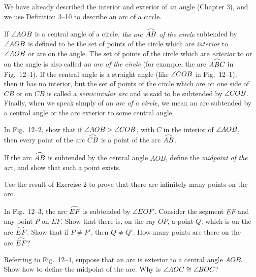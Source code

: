 \documentclass[11pt]{book}
\newcommand{\XIIarc}[1]{\overset{\raisebox{-0.25ex}{\scalebox{1.15}[0.85]{$\frown$}}}{#1}}
\begin{document}
We have already described the interior and exterior of an angle (Chapter 3),
and we use Definition 3--10 to describe an arc of a circle.

\begin{definition}
If $\angle AOB$ is a central angle of a circle, \emph{the arc $\XIIarc{AB}$ of
the circle} subtended by $\angle AOB$ is defined to be the set of points of the
circle which are \emph{interior} to $\angle AOB$ or are on the angle. The set of
points of the circle which are \emph{exterior} to or on the angle is also called
\emph{an arc of the circle} (for example, the arc $\XIIarc{ABC}$ in
Fig.~12--1). If the central angle is a straight angle (like $\angle COB$ in
Fig.~12--1), then it has no interior, but the set of points of the circle which
are on one side of $CB$ or on $CB$ is called a \emph{semicircular arc} and is
said to be subtended by $\angle COB$. Finally, when we speak simply of an
\emph{arc of a circle}, we mean an arc subtended by a central angle or the arc
exterior to some central angle.
\end{definition}

\FIGXIIONE

\begin{exercisecols}
\begin{exlist}
\item In Fig.~12--2, show that if $\angle AOB > \angle COB$, with $C$ in the
      interior of $\angle AOB$, then every point of the arc $\XIIarc{CB}$ is a
      point of the arc $\XIIarc{AB}$.
\exfig{\FIGXIITWO}
\item If the arc $\XIIarc{AB}$ is subtended by the central angle $AOB$, define
      the \emph{midpoint of the arc}, and show that such a point exists.
\item Use the result of Exercise 2 to prove that there are infinitely many
      points on the arc.
\item In Fig.~12--3, the arc $\XIIarc{EF}$ is subtended by $\angle EOF$. Consider
      the segment $EF$ and any point $P$ on $EF$. Show that there is, on the ray
      $OP$, a point $Q$, which is on the arc $\XIIarc{EF}$. Show that if
      $P \neq P'$, then $Q \neq Q'$. How many points are there on the arc
      $\XIIarc{EF}$?
\exfig{\FIGXIITHREE}
\item Referring to Fig.~12--4, suppose that an arc is exterior to a central
      angle $AOB$. Show how to define the midpoint of the arc. Why is
      $\angle AOC \cong \angle BOC$?
\exfig{\FIGXIIFOUR}
\end{exlist}
\end{exercisecols}
\end{document}
